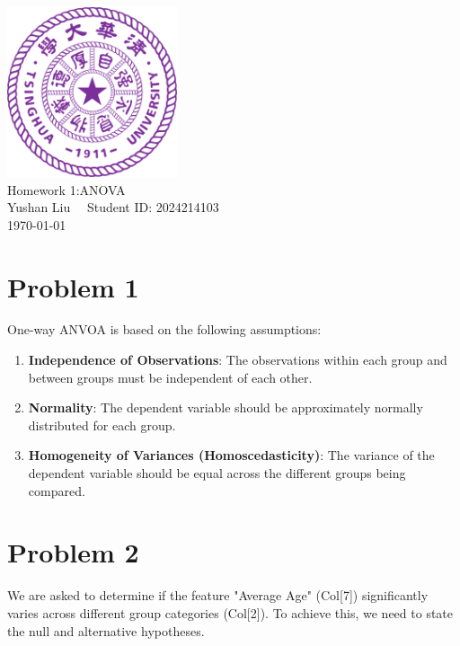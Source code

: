 \documentclass[12pt]{article}
\begin{document}
\begin{titlepage}
    \begin{center}
        \includegraphics[width=5cm]{tsinghua_logo.png}\\[4cm]  %
        {\Huge Homework 1:ANOVA} \\[2cm]
        {\large Yushan Liu  \ \  Student ID: 2024214103}\\[6cm]
        {\normalsize \today}\\[1cm]
    \end{center}
\end{titlepage}

\section*{Problem 1}

One-way ANVOA is based on the following assumptions:

\begin{enumerate}
    \item \textbf{Independence of Observations}: The observations within each group and between groups must be independent of each other.
    
    \item \textbf{Normality}: The dependent variable should be approximately normally distributed for each group.
    
    \item \textbf{Homogeneity of Variances (Homoscedasticity)}: The variance of the dependent variable should be equal across the different groups being compared.
\end{enumerate}

\section*{Problem 2}

We are asked to determine if the feature "Average Age" (Col[7]) significantly varies across different group categories (Col[2]). To achieve this, we need to state the null and alternative hypotheses.
\end{document}
